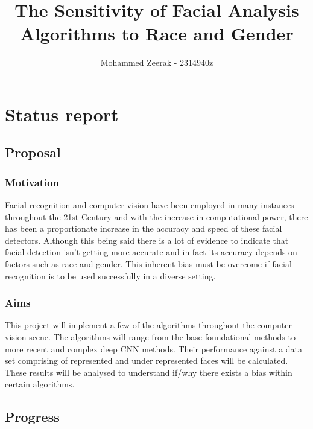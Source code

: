 \documentclass[11pt]{article}
\title{The Sensitivity of Facial Analysis Algorithms to Race and Gender}
\author{Mohammed Zeerak - 2314940z}
\begin{document}
\maketitle


     

\section{Status report}

\subsection{Proposal}\label{proposal}

\subsubsection{Motivation}\label{motivation}

Facial recognition and computer vision have been employed in many instances throughout the 21st Century and with the increase in computational power, there has been a proportionate increase in the accuracy and speed of these facial detectors. Although this being said there is a lot of evidence to indicate that facial detection isn't getting more accurate and in fact its accuracy depends on factors such as race and gender. This inherent bias must be overcome if facial recognition is to be used successfully in a diverse setting.

\subsubsection{Aims}\label{aims}

This project will implement a few of the algorithms throughout the computer vision scene. The algorithms will range from the base foundational methods to more recent and complex deep CNN methods. Their performance against a data set comprising of represented and under represented faces will be calculated. These results will be analysed to understand if/why there exists a bias within certain algorithms. 

\subsection{Progress}\label{progress}
\end{document}
